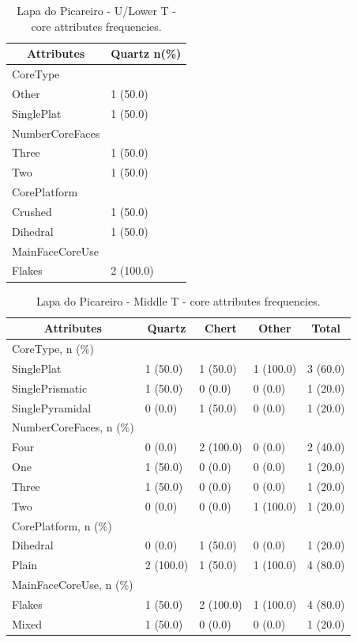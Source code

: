 \documentclass[12pt,twoside]{reedthesis}
\begin{document}
\begin{table}[!h]

\caption{\label{tab:coreattributesLP1}Lapa do Picareiro - U/Lower T - core attributes frequencies.}
\centering
\fontsize{9}{11}\selectfont
\begin{tabular}[t]{ll}
\toprule
\multicolumn{1}{c}{\textbf{Attributes}} & \multicolumn{1}{c}{\textbf{Quartz n(\%)}}\\
\midrule
CoreType & \\
Other & 1 (50.0)\\
SinglePlat & 1 (50.0)\\
NumberCoreFaces & \\
Three & 1 (50.0)\\
\addlinespace
Two & 1 (50.0)\\
CorePlatform & \\
Crushed & 1 (50.0)\\
Dihedral & 1 (50.0)\\
MainFaceCoreUse & \\
\addlinespace
Flakes & 2 (100.0)\\
\bottomrule
\end{tabular}
\end{table}
\begin{table}[!h]

\caption{\label{tab:coreattributesLP2}Lapa do Picareiro - Middle T - core attributes frequencies.}
\centering
\fontsize{9}{11}\selectfont
\begin{tabular}[t]{lllll}
\toprule
\multicolumn{1}{c}{\textbf{Attributes}} & \multicolumn{1}{c}{\textbf{Quartz}} & \multicolumn{1}{c}{\textbf{Chert}} & \multicolumn{1}{c}{\textbf{Other}} & \multicolumn{1}{c}{\textbf{Total}}\\
\midrule
CoreType, n (\%) &  &  &  & \\
SinglePlat & 1 (50.0) & 1 (50.0) & 1 (100.0) & 3 (60.0)\\
SinglePrismatic & 1 (50.0) & 0 (0.0) & 0 (0.0) & 1 (20.0)\\
SinglePyramidal & 0 (0.0) & 1 (50.0) & 0 (0.0) & 1 (20.0)\\
NumberCoreFaces, n (\%) &  &  &  & \\
\addlinespace
Four & 0 (0.0) & 2 (100.0) & 0 (0.0) & 2 (40.0)\\
One & 1 (50.0) & 0 (0.0) & 0 (0.0) & 1 (20.0)\\
Three & 1 (50.0) & 0 (0.0) & 0 (0.0) & 1 (20.0)\\
Two & 0 (0.0) & 0 (0.0) & 1 (100.0) & 1 (20.0)\\
CorePlatform, n (\%) &  &  &  & \\
\addlinespace
Dihedral & 0 (0.0) & 1 (50.0) & 0 (0.0) & 1 (20.0)\\
Plain & 2 (100.0) & 1 (50.0) & 1 (100.0) & 4 (80.0)\\
MainFaceCoreUse, n (\%) &  &  &  & \\
Flakes & 1 (50.0) & 2 (100.0) & 1 (100.0) & 4 (80.0)\\
Mixed & 1 (50.0) & 0 (0.0) & 0 (0.0) & 1 (20.0)\\
\bottomrule
\end{tabular}
\end{table}
\end{document}
